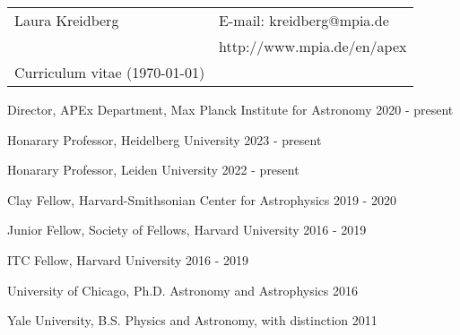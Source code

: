 \documentclass[12pt,letterpaper]{article}
\def\name{Laura R. Kreidberg}
\begin{document}
 \sloppy


\begin{tabular}{@{}p{4.0in}@{}p{5.0in}}
    \LARGE{Laura Kreidberg}                  & E-mail: kreidberg@mpia.de\\  
    \,                                       & http://www.mpia.de/en/apex \\ 
    \large{Curriculum vitae} (\today) & \, \\
\end{tabular}
\vspace{5mm}

\begin{list}{}{\cvlist}
    \item Director, APEx Department, Max Planck Institute for Astronomy \hfill 2020 - present\\
    \item Honarary Professor, Heidelberg University \hfill 2023 - present \\
    \item Honarary Professor, Leiden University \hfill 2022 - present \\
    \item Clay Fellow, Harvard-Smithsonian Center for Astrophysics \hfill 2019 - 2020\\
    \item Junior Fellow, Society of Fellows, Harvard University \hfill 2016 - 2019\\
    \item ITC Fellow, Harvard University \hfill 2016 - 2019\\
\end{list}


\begin{list}{}{\cvlist}
    \item University of Chicago, Ph.D. Astronomy and Astrophysics \hfill 2016
    \item Yale University, B.S. Physics and Astronomy, with distinction \hfill 2011
\end{list}


\end{document}
